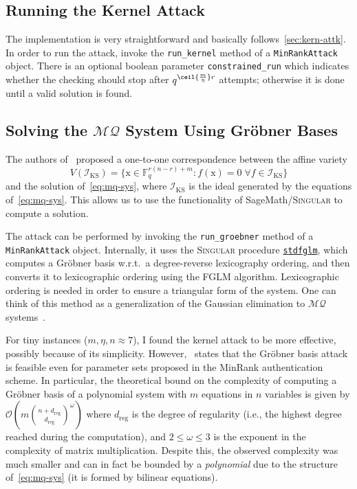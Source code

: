 \documentclass{article}
\theoremstyle{remark}
\theoremstyle{definition}
\theoremstyle{plain}
\renewcommand*{\vec}[1]{\bm{\mathrm{#1}}}
\newcommand{\MQ}{\ensuremath{\mathcal{MQ}}}
\begin{document}
\subsection{Running the Kernel Attack}\label{app:run-kern-attk}
The implementation is very straightforward and basically
follows~\cref{sec:kern-attk}.  In order to run the attack, invoke the
\texttt{run\_kernel} method of a \texttt{MinRankAttack} object.  There is an
optional boolean parameter \texttt{constrained\_run} which indicates whether the
checking should stop after $q^{\ceil{\frac m \eta} r}$ attempts; otherwise it is
done until a valid solution is found.

\subsection{Solving the \MQ{} System Using Gröbner Bases}\label{app:solv-groeb}
The authors of~\autocite{FLP08} proposed a one-to-one correspondence between the
affine variety
$$
V(\mathcal{I}_{\mathrm{KS}}) = \{\vec{x} \in \mathbb{F}_q^{r (n - r) + m} :
f(\vec{x}) = 0 \; \forall f \in \mathcal{I}_{\mathrm{KS}}\}
$$
and the solution of~\eqref{eq:mq-sys}, where $\mathcal{I}_{\mathrm{KS}}$ is the
ideal generated by the equations of~\eqref{eq:mq-sys}.  This allows us to use
the functionality of SageMath/\textsc{Singular} to compute a solution.

The attack can be performed by invoking the \texttt{run\_groebner} method of a
\texttt{MinRankAttack} object.  Internally, it uses the \textsc{Singular}
procedure
\href{https://www.singular.uni-kl.de/Manual/4-0-2/sing_403.htm}{\texttt{stdfglm}},
which computes a Gröbner basis w.r.t.\ a degree-reverse lexicography ordering,
and then converts it to lexicographic ordering using the FGLM algorithm.
Lexicographic ordering is needed in order to ensure a triangular form of the
system.  One can think of this method as a generalization of the Gaussian
elimination to \MQ{} systems~\autocite[ch.\ 2, 3]{CLO15}.

For tiny instances ($m, \eta, n \approx 7$), I found the kernel attack to be
more effective, possibly because of its simplicity.  However,~\autocite{FLP08}
states that the Gröbner basis attack is feasible even for parameter sets
proposed in the MinRank authentication scheme.  In particular, the theoretical
bound on the complexity of computing a Gröbner basis of a polynomial system with
$m$ equations in $n$ variables is given by
$\mathcal{O}\left(m \binom{n +
    d_{\mathrm{reg}}}{d_{\mathrm{reg}}}^\omega\right)$ where $d_{\mathrm{reg}}$
is the degree of regularity (i.e., the highest degree reached during the
computation), and $2 \le \omega \le 3$ is the exponent in the complexity of
matrix multiplication.  Despite this, the observed complexity was much smaller
and can in fact be bounded by a \emph{polynomial} due to the structure
of~\eqref{eq:mq-sys} (it is formed by bilinear equations).
\end{document}

